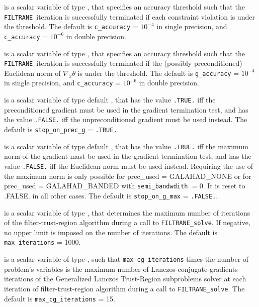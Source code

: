\documentclass{galahad}
\newcommand{\packagename}{FILTRANE}
\newcommand{\sym}{\sf\small}
\newcommand{\filtrane}{{\tt \packagename}}
\begin{document}
\begin{description}
 is a scalar variable of type \realdp, that
specifies an accuracy threshold such that the \filtrane\ iteration is
successfully terminated if each constraint violation is under the threshold.
The default is {\tt c\_accuracy} = $10^{-4}$ in single precision, and
{\tt c\_accuracy} = $10^{-6}$ in double precision.

 is a scalar variable of type \realdp, that
specifies an accuracy threshold such that the \filtrane\ iteration is
successfully terminated if the (possibly preconditioned) Euclidean norm
of $\nabla_x \theta$ is under the threshold.
The default is {\tt g\_accuracy} = $10^{-4}$ in single precision, and
{\tt c\_accuracy} = $10^{-6}$ in double precision.

 is a scalar variable of type default \logical, that
has the value {\tt .TRUE.} iff the preconditioned gradient must be used 
in the gradient termination test, and has the value {\tt .FALSE.} iff the
unpreconditioned gradient must be used instead.
The default is {\tt stop\_on\_prec\_g} = {\tt .TRUE.}.

 is a scalar variable of type default \logical, that
has the value {\tt .TRUE.} iff the maximum norm of the gradient must be used 
in the gradient termination test, and has the value {\tt .FALSE.} iff the
Euclidean norm must be used instead. Requiring the use of the maximum norm
is only possible for {prec\_used} = {\sym GALAHAD\_NONE} or for
{prec\_used} = {\sym GALAHAD\_BANDED} with {\tt semi\_bandwdith} $= 0$.  It is
reset to .FALSE. in all other cases.
The default is {\tt stop\_on\_g\_max} = {\tt .FALSE.}.

 is a scalar variable of type \integer, that
determines the maximum number of iterations of the filter-trust-region
algorithm during a call to {\tt \packagename\_solve}. If negative, no upper
limit is imposed on the number of iterations.
The default is {\tt max\_iterations} = 1000.

 is a scalar variable of type \integer, such
that {\tt max\_cg\_iterations} times the number of problem's variables
is the maximum number of Lanczos-conjugate-gradients iterations of the 
Generalized Lanczos Trust-Region subproblems solver at each iteration of
filter-trust-region algorithm during a call to {\tt \packagename\_solve}.
The default is {\tt max\_cg\_iterations} = 15.


\end{description}
\end{document}
